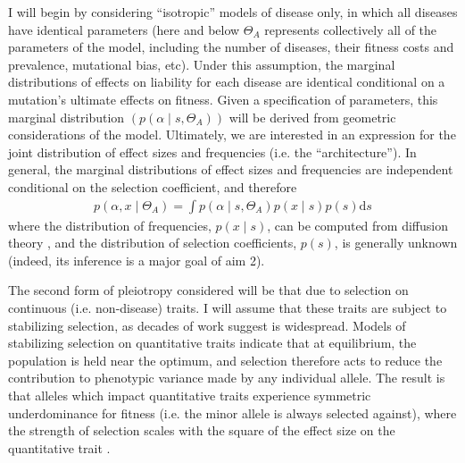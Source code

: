 \message{ !name(ResearchStrategy.tex)}\documentclass[11pt]{article}
\begin{document}
I will begin by considering ``isotropic'' models of disease only, in which all diseases have identical parameters (here and below $\Theta_A$ represents collectively all of the parameters of the model, including the number of diseases, their fitness costs and prevalence, mutational bias, etc). Under this assumption, the marginal distributions of effects on liability for each disease are identical conditional on a mutation's ultimate effects on fitness. Given a specification of parameters, this marginal distribution $(p\left(\alpha \mid s,\Theta_A\right))$ will be derived from geometric considerations of the model. Ultimately, we are interested in an expression for the joint distribution of effect sizes and frequencies (i.e. the ``architecture''). In general, the marginal distributions of effect sizes and frequencies are independent conditional on the selection coefficient, and therefore
\begin{align}
  p\left(\alpha,x \mid \Theta_A\right) = \int p\left(\alpha \mid s,\Theta_A\right) p\left(x \mid s \right) p\left(s\right)\mathrm{d}s
  \label{exp-for-arch}
\end{align}
where the distribution of frequencies, $p\left(x \mid s \right)$, can be computed from diffusion theory \cite{EwensBook}, and the distribution of selection coefficients, $p\left(s\right)$, is generally unknown (indeed, its inference is a major goal of aim 2).

The second form of pleiotropy considered will be that due to selection on continuous (i.e. non-disease) traits. I will assume that these traits are subject to stabilizing selection, as decades of work suggest is widespread\cite{Turelli:1984tb, Barton:1989du, Kingsolver:2001di}. Models of stabilizing selection on quantitative traits indicate that at equilibrium, the population is held near the optimum, and selection therefore acts to reduce the contribution to phenotypic variance made by any individual allele\cite{Johnson:2005do,Robertson:1956dk}. The result is that alleles which impact quantitative traits experience symmetric underdominance for fitness (i.e. the minor allele is always selected against), where the strength of selection scales with the square of the effect size on the quantitative trait \cite{Robertson:1956dk}.
\end{document}
